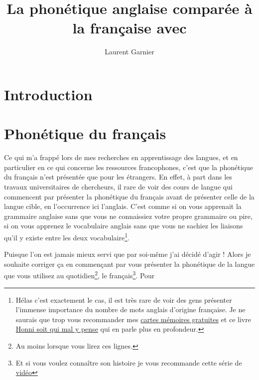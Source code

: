 \documentclass[12pt,a4paper]{book}
\begin{document}
\title{La phonétique anglaise comparée à la française avec \XeLaTeX}
\author{Laurent Garnier}

\maketitle
\tableofcontents

\part{Introduction}




\part{Phonétique du français}
Ce qui m'a frappé lors de mes recherches en apprentissage des langues,
et en particulier en ce qui concerne les ressources francophones,
c'est que la phonétique du français n'est présentée que pour les
étrangers. En effet, à part dans les travaux universitaires de
chercheurs, il rare de voir des cours de langue qui commencent par
présenter la phonétique du français avant de présenter celle de la
langue cible, en l'occurrence ici l'anglais. C'est comme si on vous
apprenait la grammaire anglaise sans que vous ne connaissiez votre
propre grammaire ou pire, si on vous apprenez le vocabulaire anglais
sans que vous ne sachiez les liaisons qu'il y existe entre les deux
vocabulaire\footnote{Hélas c'est exactement le cas, il est très rare
  de voir des gens présenter l'immense importance du nombre de mots
  anglais d'origine française. Je ne saurais que trop vous recommander
mes
\href{https://tinycards.duolingo.com/decks/6VNKUdba/english-words-with-french-origin}{cartes
  mémoires gratuites} et ce livre
\href{https://www.amazon.fr/gp/product/225315444X/ref=as_li_tl?ie=UTF8&camp=1642&creative=6746&creativeASIN=225315444X&linkCode=as2&tag=wwwbecomefree-21&linkId=5317e7b0e063b4d6c7c676b11420e49d}{Honni
  soit qui mal y pense} qui en parle plus en profondeur.}.\par
Puisque l'on est jamais mieux servi que par soi-même j'ai décidé
d'agir ! Alors je souhaite corriger ça en commençant par vous
présenter la phonétique de la langue que vous utilisez au
quotidien\footnote{Au moins lorsque vous lirez ces lignes.}, le
français\footnote{Et si vous voulez connaître son histoire je vous
  recommande cette série de \href{https://www.youtube.com/watch?v=rHSIPt_ehvc&list=PLH2hhYn999aRfv2odG4SozTXCHbZaX_ji}{vidéo}}. Pour
\end{document}
